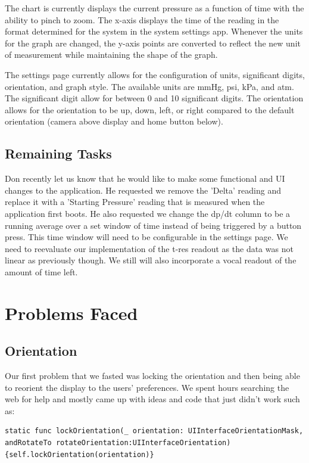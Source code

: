\documentclass[onecolumn, draftclsnofoot,10pt, compsoc]{IEEEtran}
\begin{document}
    The chart is currently displays the current pressure as a function of time with the ability to pinch to zoom.
    The x-axis displays the time of the reading in the format determined for the system in the system settings app.
    Whenever the units for the graph are changed, the y-axis points are converted to reflect the new unit of measurement while maintaining the shape of the graph.

    The settings page currently allows for the configuration of units, significant digits, orientation, and graph style.
    The available units are mmHg, psi, kPa, and atm.
    The significant digit allow for between 0 and 10 significant digits.
    The orientation allows for the orientation to be up, down, left, or right compared to the default orientation (camera above display and home button below).

    \subsection{Remaining Tasks}
        Don recently let us know that he would like to make some functional and UI changes to the application.
        He requested we remove the 'Delta' reading and replace it with a 'Starting Pressure' reading that is measured when the application first boots.
        He also requested we change the dp/dt column to be a running average over a set window of time instead of being triggered by a button press.
        This time window will need to be configurable in the settings page.
        We need to reevaluate our implementation of the t-res readout as the data was not linear as previously though.
        We still will also incorporate a vocal readout of the amount of time left.

\section{Problems Faced}

\subsection{Orientation}
Our first problem that we fasted was locking the orientation and then being able to reorient the display to the users’ preferences.
We spent hours searching the web for help and mostly came up with ideas and code that just didn't work such as:

\begin{lstlisting}
static func lockOrientation(_ orientation: UIInterfaceOrientationMask, andRotateTo rotateOrientation:UIInterfaceOrientation) {self.lockOrientation(orientation)}
\end{lstlisting}
\end{document}
